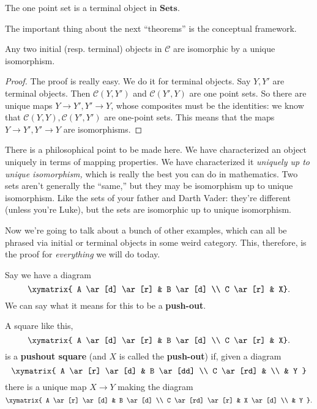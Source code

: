 \begin{example} The one point set is a terminal object in $\mathbf{Sets}$.
\end{example}

The important thing about the next ``theorems'' is the conceptual framework.
\begin{theorem} Any two initial (resp. terminal) objects in $\mathcal{C}$ are
isomorphic by a unique isomorphism. \end{theorem} \begin{proof} The proof is
really easy. We do it for terminal objects. Say $Y, Y'$ are terminal objects.
Then $\mathcal{C}(Y, Y')$ and $\mathcal{C}(Y', Y)$ are one point sets. So
there are unique maps $Y \to Y', Y' \to Y$, whose composites must be the
identities: we know that $\mathcal{C}(Y, Y) , \mathcal{C}(Y', Y')$ are
one-point sets. This means that the maps $Y \to Y', Y' \to Y$ are
isomorphisms. \end{proof}

There is a philosophical point to be made here. We have characterized an
object uniquely in terms of mapping properties. We have characterized it
\emph{uniquely up to unique isomorphism,} which is really the best you can do
in mathematics. Two sets aren't generally the ``same,'' but they may be
isomorphism up to unique isomorphism. Like the sets of your father and Darth
Vader: they're different (unless you're Luke), but the sets are isomorphic up
to unique isomorphism.

Now we're going to talk about a bunch of other examples, which can all be
phrased via initial or terminal objects in some weird category. This,
therefore, is the proof for \emph{everything} we will do today.

Say we have a diagram \[ \xymatrix{ A \ar[d] \ar[r] & B \ar[d] \\ C \ar[r] &
X}. \] We can say what it means for this to be a \textbf{push-out}.

\begin{definition} A square like this, \[ \xymatrix{ A \ar[d] \ar[r] & B
\ar[d] \\ C \ar[r] & X}. \] is a \textbf{pushout square} (and $X$ is called
the \textbf{push-out}) if, given a diagram \[ \xymatrix{ A \ar[r] \ar[d] & B
\ar[dd] \\ C \ar[rd] & \\ & Y }\] there is a unique map $X \to Y$ making the
diagram \[ \xymatrix{ A \ar[r] \ar[d] & B \ar[d] \\ C \ar[rd] \ar[r] & X
\ar[d] \\ & Y }.\] \end{definition}

